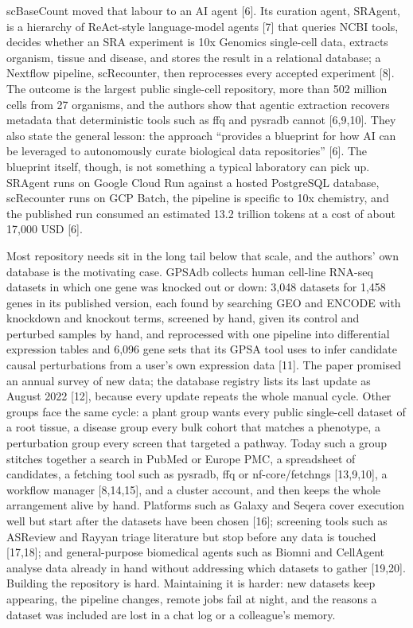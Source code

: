 \documentclass[11pt,a4paper]{article}
\begin{document}
scBaseCount moved that labour to an AI agent {[}6{]}. Its curation
agent, SRAgent, is a hierarchy of ReAct-style language-model agents
{[}7{]} that queries NCBI tools, decides whether an SRA experiment is
10x Genomics single-cell data, extracts organism, tissue and disease,
and stores the result in a relational database; a Nextflow pipeline,
scRecounter, then reprocesses every accepted experiment {[}8{]}. The
outcome is the largest public single-cell repository, more than 502
million cells from 27 organisms, and the authors show that agentic
extraction recovers metadata that deterministic tools such as ffq and
pysradb cannot {[}6,9,10{]}. They also state the general lesson: the
approach ``provides a blueprint for how AI can be leveraged to
autonomously curate biological data repositories'' {[}6{]}. The
blueprint itself, though, is not something a typical laboratory can pick
up. SRAgent runs on Google Cloud Run against a hosted PostgreSQL
database, scRecounter runs on GCP Batch, the pipeline is specific to 10x
chemistry, and the published run consumed an estimated 13.2 trillion
tokens at a cost of about 17,000 USD {[}6{]}.

Most repository needs sit in the long tail below that scale, and the
authors' own database is the motivating case. GPSAdb collects human
cell-line RNA-seq datasets in which one gene was knocked out or down:
3,048 datasets for 1,458 genes in its published version, each found by
searching GEO and ENCODE with knockdown and knockout terms, screened by
hand, given its control and perturbed samples by hand, and reprocessed
with one pipeline into differential expression tables and 6,096 gene
sets that its GPSA tool uses to infer candidate causal perturbations
from a user's own expression data {[}11{]}. The paper promised an annual
survey of new data; the database registry lists its last update as
August 2022 {[}12{]}, because every update repeats the whole manual
cycle. Other groups face the same cycle: a plant group wants every
public single-cell dataset of a root tissue, a disease group every bulk
cohort that matches a phenotype, a perturbation group every screen that
targeted a pathway. Today such a group stitches together a search in
PubMed or Europe PMC, a spreadsheet of candidates, a fetching tool such
as pysradb, ffq or nf-core/fetchngs {[}13,9,10{]}, a workflow manager
{[}8,14,15{]}, and a cluster account, and then keeps the whole
arrangement alive by hand. Platforms such as Galaxy and Seqera cover
execution well but start after the datasets have been chosen {[}16{]};
screening tools such as ASReview and Rayyan triage literature but stop
before any data is touched {[}17,18{]}; and general-purpose biomedical
agents such as Biomni and CellAgent analyse data already in hand without
addressing which datasets to gather {[}19,20{]}. Building the repository
is hard. Maintaining it is harder: new datasets keep appearing, the
pipeline changes, remote jobs fail at night, and the reasons a dataset
was included are lost in a chat log or a colleague's memory.
\end{document}
